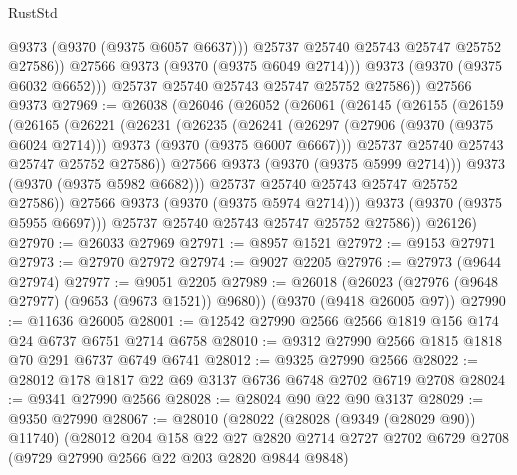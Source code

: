 \begin{lexlean}{RustStd}
\begin{coremodule}
{\begin{coremodule}
{{{{{{{{{{{{{{{{{{{{{{{{{{{{{{{{{{{{{{{                  @9373
                  (@9370 (@9375 @6057 @6637)))
                @25737
                @25740
                @25743
                @25747
                @25752
                @27586))
            @27566
            @9373
            (@9370 (@9375 @6049 @2714)))
          @9373
          (@9370 (@9375 @6032 @6652)))
        @25737
        @25740
        @25743
        @25747
        @25752
        @27586))
    @27566
    @9373
@27969 := @26038
    (@26046
      (@26052
        (@26061
          (@26145
            (@26155
              (@26159
                (@26165
                  (@26221
                    (@26231
                      (@26235
                        (@26241
                          (@26297
                            (@27906 (@9370 (@9375 @6024 @2714)))
                            @9373
                            (@9370 (@9375 @6007 @6667)))
                          @25737
                          @25740
                          @25743
                          @25747
                          @25752
                          @27586))
                      @27566
                      @9373
                      (@9370 (@9375 @5999 @2714)))
                    @9373
                    (@9370 (@9375 @5982 @6682)))
                  @25737
                  @25740
                  @25743
                  @25747
                  @25752
                  @27586))
              @27566
              @9373
              (@9370 (@9375 @5974 @2714)))
            @9373
            (@9370 (@9375 @5955 @6697)))
          @25737
          @25740
          @25743
          @25747
          @25752
          @27586))
      @26126)
@27970 := @26033 @27969
@27971 := @8957 @1521
@27972 := @9153 @27971
@27973 := @27970 @27972
@27974 := @9027 @2205
@27976 := @27973 (@9644 @27974)
@27977 := @9051 @2205
@27989 := @26018
    (@26023 (@27976 (@9648 @27977) (@9653 (@9673 @1521)) @9680))
    (@9370 (@9418 @26005 @97))
@27990 := @11636 @26005
@28001 := @12542 @27990 @2566 @2566 @1819 @156 @174 @24 @6737 @6751 @2714 @6758
@28010 := @9312 @27990 @2566 @1815 @1818 @70 @291 @6737 @6749 @6741
@28012 := @9325 @27990 @2566
@28022 := @28012 @178 @1817 @22 @69 @3137 @6736 @6748 @2702 @6719 @2708
@28024 := @9341 @27990 @2566
@28028 := @28024 @90 @22 @90 @3137
@28029 := @9350 @27990
@28067 := @28010
    (@28022
      (@28028 (@9349 (@28029 @90)) @11740)
      (@28012
        @204
        @158
        @22
        @27
        @2820
        @2714
        @2727
        @2702
        @6729
        @2708
        (@9729 @27990 @2566 @22 @203 @2820 @9844 @9848)
}}}}}}}}}}}}}}}}}}}}}}}}}}}}}}}}}}}}}}}
\end{coremodule}}
\end{coremodule}
\end{lexlean}
